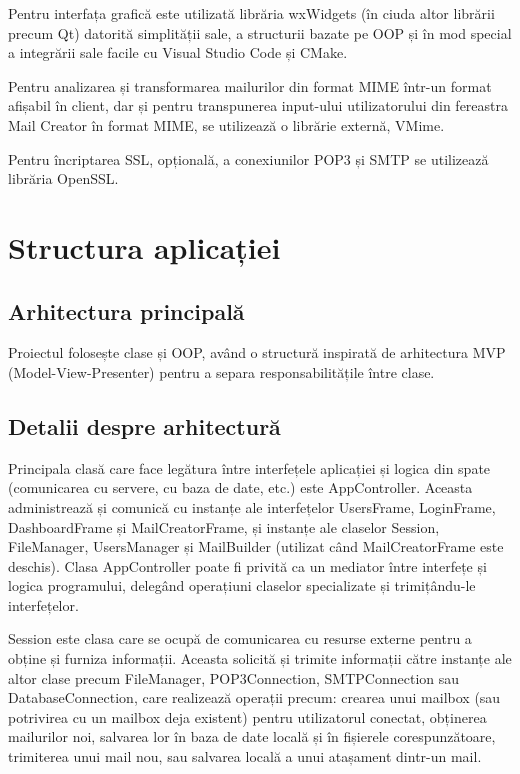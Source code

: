 \documentclass[runningheads]{llncs}
\begin{document}
Pentru interfața grafică este utilizată librăria wxWidgets (în ciuda altor librării precum Qt) datorită simplității sale, a structurii bazate pe OOP și în mod special a integrării sale facile cu Visual Studio Code și CMake.

Pentru analizarea și transformarea mailurilor din format MIME\cite{ref_rfc_mime} într-un format afișabil în client, dar și pentru transpunerea input-ului utilizatorului din fereastra Mail Creator în format MIME, se utilizează o librărie externă, VMime.

Pentru încriptarea SSL, opțională, a conexiunilor POP3 și SMTP se utilizează librăria OpenSSL.


\section{Structura aplicației}


\subsection{Arhitectura principală}

Proiectul folosește clase și OOP, având o structură inspirată de arhitectura MVP (Model-View-Presenter) pentru a separa responsabilitățile între clase.



\subsection{Detalii despre arhitectură}


Principala clasă care face legătura între interfețele aplicației și logica din spate (comunicarea cu servere, cu baza de date, etc.) este AppController. Aceasta administrează și comunică cu instanțe ale interfețelor UsersFrame, LoginFrame, DashboardFrame și MailCreatorFrame, și instanțe ale claselor Session, FileManager, UsersManager și MailBuilder (utilizat când MailCreatorFrame este deschis). Clasa AppController poate fi privită ca un mediator între interfețe și logica programului, delegând operațiuni claselor specializate și trimițându-le interfețelor.

Session este clasa care se ocupă de comunicarea cu resurse externe pentru a obține și furniza informații. Aceasta solicită și trimite informații către instanțe ale altor clase precum FileManager, POP3Connection, SMTPConnection sau DatabaseConnection, care realizează operații precum: crearea unui mailbox (sau potrivirea cu un mailbox deja existent) pentru utilizatorul conectat, obținerea mailurilor noi, salvarea lor în baza de date locală și în fișierele corespunzătoare, trimiterea unui mail nou, sau salvarea locală a unui atașament dintr-un mail.
\end{document}
